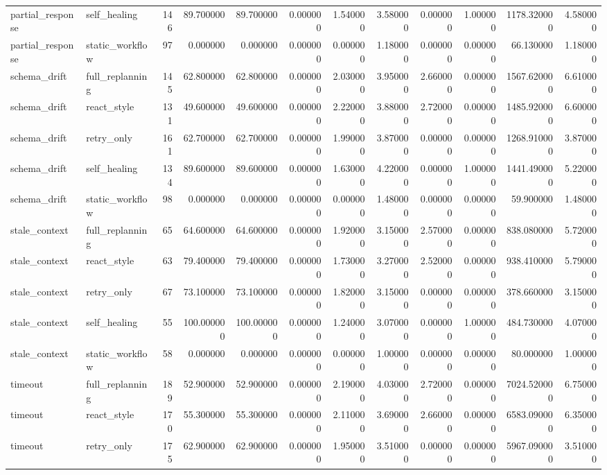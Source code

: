 \begin{tabular}{llrrrrrrrrrr}
partial_response & self_healing & 146 & 89.700000 & 89.700000 & 0.000000 & 1.540000 & 3.580000 & 0.000000 & 1.000000 & 1178.320000 & 4.580000 \\
partial_response & static_workflow & 97 & 0.000000 & 0.000000 & 0.000000 & 0.000000 & 1.180000 & 0.000000 & 0.000000 & 66.130000 & 1.180000 \\
schema_drift & full_replanning & 145 & 62.800000 & 62.800000 & 0.000000 & 2.030000 & 3.950000 & 2.660000 & 0.000000 & 1567.620000 & 6.610000 \\
schema_drift & react_style & 131 & 49.600000 & 49.600000 & 0.000000 & 2.220000 & 3.880000 & 2.720000 & 0.000000 & 1485.920000 & 6.600000 \\
schema_drift & retry_only & 161 & 62.700000 & 62.700000 & 0.000000 & 1.990000 & 3.870000 & 0.000000 & 0.000000 & 1268.910000 & 3.870000 \\
schema_drift & self_healing & 134 & 89.600000 & 89.600000 & 0.000000 & 1.630000 & 4.220000 & 0.000000 & 1.000000 & 1441.490000 & 5.220000 \\
schema_drift & static_workflow & 98 & 0.000000 & 0.000000 & 0.000000 & 0.000000 & 1.480000 & 0.000000 & 0.000000 & 59.900000 & 1.480000 \\
stale_context & full_replanning & 65 & 64.600000 & 64.600000 & 0.000000 & 1.920000 & 3.150000 & 2.570000 & 0.000000 & 838.080000 & 5.720000 \\
stale_context & react_style & 63 & 79.400000 & 79.400000 & 0.000000 & 1.730000 & 3.270000 & 2.520000 & 0.000000 & 938.410000 & 5.790000 \\
stale_context & retry_only & 67 & 73.100000 & 73.100000 & 0.000000 & 1.820000 & 3.150000 & 0.000000 & 0.000000 & 378.660000 & 3.150000 \\
stale_context & self_healing & 55 & 100.000000 & 100.000000 & 0.000000 & 1.240000 & 3.070000 & 0.000000 & 1.000000 & 484.730000 & 4.070000 \\
stale_context & static_workflow & 58 & 0.000000 & 0.000000 & 0.000000 & 0.000000 & 1.000000 & 0.000000 & 0.000000 & 80.000000 & 1.000000 \\
timeout & full_replanning & 189 & 52.900000 & 52.900000 & 0.000000 & 2.190000 & 4.030000 & 2.720000 & 0.000000 & 7024.520000 & 6.750000 \\
timeout & react_style & 170 & 55.300000 & 55.300000 & 0.000000 & 2.110000 & 3.690000 & 2.660000 & 0.000000 & 6583.090000 & 6.350000 \\
timeout & retry_only & 175 & 62.900000 & 62.900000 & 0.000000 & 1.950000 & 3.510000 & 0.000000 & 0.000000 & 5967.090000 & 3.510000 \\

\end{tabular}
